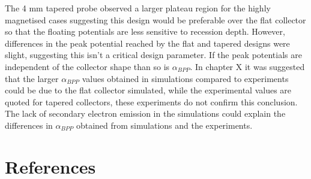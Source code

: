 The 4 mm tapered probe observed a larger plateau region for the highly magnetised cases suggesting this design would be preferable over the flat collector so that the floating potentials are less sensitive to recession depth. However, differences in the peak potential reached by the flat and tapered designs were slight, suggesting this isn't a critical design parameter. If the peak potentials are independent of the collector shape than so is $\alpha_{BPP}$. In chapter X it was suggested that the larger $\alpha_{BPP}$ values obtained in simulations compared to experiments could be due to the flat collector simulated, while the experimental values are quoted for tapered collectors,  these experiments do not confirm this conclusion. The lack of secondary electron emission in the simulations could explain the differences in $\alpha_{BPP}$ obtained from simulations and the experiments.












\section{References}

	
 
